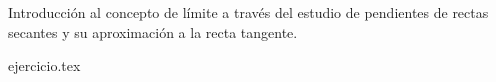 
Introducción al concepto de límite a través del estudio de pendientes de rectas secantes y su aproximación a la recta tangente.

\begin{enumerate}
    {ejercicio.tex}
\end{enumerate}
